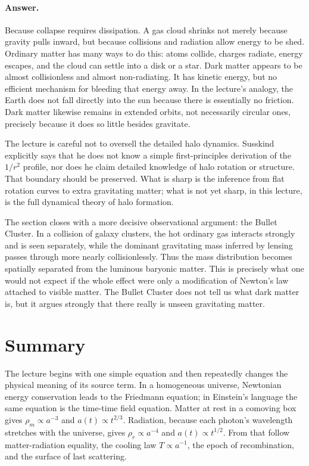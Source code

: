 \paragraph{Answer.} Because collapse requires dissipation. A gas cloud shrinks not merely because gravity pulls inward, but because collisions and radiation allow energy to be shed. Ordinary matter has many ways to do this: atoms collide, charges radiate, energy escapes, and the cloud can settle into a disk or a star. Dark matter appears to be almost collisionless and almost non-radiating. It has kinetic energy, but no efficient mechanism for bleeding that energy away. In the lecture's analogy, the Earth does not fall directly into the sun because there is essentially no friction. Dark matter likewise remains in extended orbits, not necessarily circular ones, precisely because it does so little besides gravitate.

The lecture is careful not to oversell the detailed halo dynamics. Susskind explicitly says that he does not know a simple first-principles derivation of the \(1/r^2\) profile, nor does he claim detailed knowledge of halo rotation or structure. That boundary should be preserved. What is sharp is the inference from flat rotation curves to extra gravitating matter; what is not yet sharp, in this lecture, is the full dynamical theory of halo formation.

The section closes with a more decisive observational argument: the Bullet Cluster. In a collision of galaxy clusters, the hot ordinary gas interacts strongly and is seen separately, while the dominant gravitating mass inferred by lensing passes through more nearly collisionlessly. Thus the mass distribution becomes spatially separated from the luminous baryonic matter. This is precisely what one would not expect if the whole effect were only a modification of Newton's law attached to visible matter. The Bullet Cluster does not tell us what dark matter is, but it argues strongly that there really is unseen gravitating matter.

\section{Summary}

The lecture begins with one simple equation and then repeatedly changes the physical meaning of its source term. In a homogeneous universe, Newtonian energy conservation leads to the Friedmann equation; in Einstein's language the same equation is the time-time field equation. Matter at rest in a comoving box gives \(\rho_m\propto a^{-3}\) and \(a(t)\propto t^{2/3}\). Radiation, because each photon's wavelength stretches with the universe, gives \(\rho_r\propto a^{-4}\) and \(a(t)\propto t^{1/2}\). From that follow matter-radiation equality, the cooling law \(T\propto a^{-1}\), the epoch of recombination, and the surface of last scattering.

